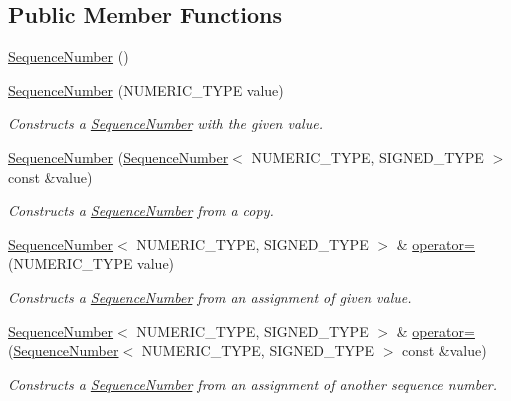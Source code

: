 \subsection*{Public Member Functions}
\begin{DoxyCompactItemize}
\item 
\hyperlink{classns3_1_1SequenceNumber_a71a835e12ac753f85485ef381554d46d}{Sequence\+Number} ()
\item 
\hyperlink{classns3_1_1SequenceNumber_a6c9285764d7669fd4725992229ae3d98}{Sequence\+Number} (N\+U\+M\+E\+R\+I\+C\+\_\+\+T\+Y\+PE value)
\begin{DoxyCompactList}\small\item\em Constructs a \hyperlink{classns3_1_1SequenceNumber}{Sequence\+Number} with the given value. \end{DoxyCompactList}\item 
\hyperlink{classns3_1_1SequenceNumber_a6665291471b3bca187eea561a169f5aa}{Sequence\+Number} (\hyperlink{classns3_1_1SequenceNumber}{Sequence\+Number}$<$ N\+U\+M\+E\+R\+I\+C\+\_\+\+T\+Y\+PE, S\+I\+G\+N\+E\+D\+\_\+\+T\+Y\+PE $>$ const \&value)
\begin{DoxyCompactList}\small\item\em Constructs a \hyperlink{classns3_1_1SequenceNumber}{Sequence\+Number} from a copy. \end{DoxyCompactList}\item 
\hyperlink{classns3_1_1SequenceNumber}{Sequence\+Number}$<$ N\+U\+M\+E\+R\+I\+C\+\_\+\+T\+Y\+PE, S\+I\+G\+N\+E\+D\+\_\+\+T\+Y\+PE $>$ \& \hyperlink{classns3_1_1SequenceNumber_a7e1e19f0c48feec769f09f35c0f4d72a}{operator=} (N\+U\+M\+E\+R\+I\+C\+\_\+\+T\+Y\+PE value)
\begin{DoxyCompactList}\small\item\em Constructs a \hyperlink{classns3_1_1SequenceNumber}{Sequence\+Number} from an assignment of given value. \end{DoxyCompactList}\item 
\hyperlink{classns3_1_1SequenceNumber}{Sequence\+Number}$<$ N\+U\+M\+E\+R\+I\+C\+\_\+\+T\+Y\+PE, S\+I\+G\+N\+E\+D\+\_\+\+T\+Y\+PE $>$ \& \hyperlink{classns3_1_1SequenceNumber_a980bec0c236d20481c4c5d00c85a52ee}{operator=} (\hyperlink{classns3_1_1SequenceNumber}{Sequence\+Number}$<$ N\+U\+M\+E\+R\+I\+C\+\_\+\+T\+Y\+PE, S\+I\+G\+N\+E\+D\+\_\+\+T\+Y\+PE $>$ const \&value)
\begin{DoxyCompactList}\small\item\em Constructs a \hyperlink{classns3_1_1SequenceNumber}{Sequence\+Number} from an assignment of another sequence number. \end{DoxyCompactList}\item 

\end{DoxyCompactItemize}
